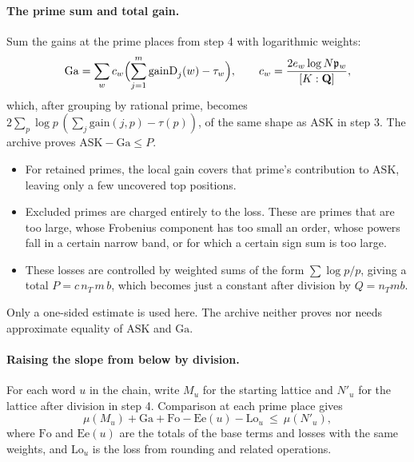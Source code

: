 \documentclass[11pt]{article}
\newcommand{\Q}{\mathbf{Q}}
\begin{document}
\paragraph{The prime sum and total gain.} Sum the gains at the prime places from step 4 with logarithmic weights:
\[
\mathrm{Ga}=\sum_w c_w\Bigl(\sum_{j=1}^{m}\mathrm{gainD}_j(w)-\tau_w\Bigr),\qquad c_w=\frac{2e_w\log N\mathfrak p_w}{[K:\Q]},
\]
which, after grouping by rational prime, becomes $2\sum_p\log p\,(\sum_j\mathrm{gain}(j,p)-\tau(p))$, of the same shape as $\mathrm{ASK}$ in step 3. The archive proves $\mathrm{ASK}-\mathrm{Ga}\le P$.
\begin{itemize}
\item For retained primes, the local gain covers that prime's contribution to $\mathrm{ASK}$, leaving only a few uncovered top positions.
\item Excluded primes are charged entirely to the loss. These are primes that are too large, whose Frobenius component has too small an order, whose powers fall in a certain narrow band, or for which a certain sign sum is too large.
\item These losses are controlled by weighted sums of the form $\sum\log p/p$, giving a total $P=c\,n_T\,m\,b$, which becomes just a constant after division by $Q=n_Tmb$.
\end{itemize}
Only a one-sided estimate is used here. The archive neither proves nor needs approximate equality of $\mathrm{ASK}$ and $\mathrm{Ga}$.

\paragraph{Raising the slope from below by division.} For each word $u$ in the chain, write $M_u$ for the starting lattice and $N'_u$ for the lattice after division in step 4. Comparison at each prime place gives
\[
\mu(M_u)+\mathrm{Ga}+\mathrm{Fo}-\mathrm{Ee}(u)-\mathrm{Lo}_u\ \le\ \mu(N'_u),
\]
where $\mathrm{Fo}$ and $\mathrm{Ee}(u)$ are the totals of the base terms and losses with the same weights, and $\mathrm{Lo}_u$ is the loss from rounding and related operations.
\end{document}
